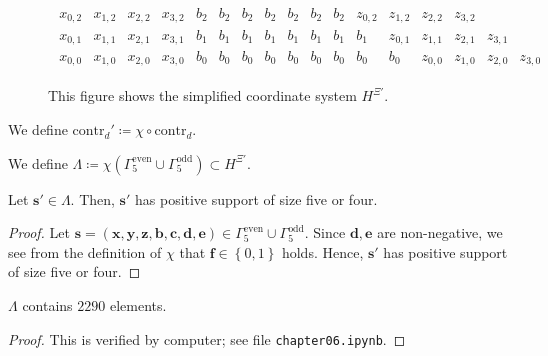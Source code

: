 \begin{definition}
\begin{figure}[H]
\begin{align*}
\begin{array}{cccccccccccccccccccc}
            x_{0,2} & x_{1,2} & x_{2,2} & x_{3,2} & b_2 & b_2 & b_2 & b_2 & b_2 & b_2 & b_2 & z_{0,2} & z_{1,2} & z_{2,2} & z_{3,2} \\
            x_{0,1} & x_{1,1} & x_{2,1} & x_{3,1} & b_1 & b_1 & b_1 & b_1 & b_1 & b_1 & b_1 & b_1 & z_{0,1} & z_{1,1} & z_{2,1} & z_{3,1} \\
            x_{0,0} & x_{1,0} & x_{2,0} & x_{3,0} & b_0 & b_0 & b_0 & b_0 & b_0 & b_0 & b_0 & b_0 & b_0 & z_{0,0} & z_{1,0} & z_{2,0} & z_{3,0}
        \end{array}
    \end{align*}  
    \caption{This figure shows the simplified coordinate system \( H^{\Xi'} \).}
    \label{fig:uhrui23h}
\end{figure}

\end{definition}

\begin{definition}
    We define \( \mathrm{contr}_d' \coloneqq \chi \circ \mathrm{contr}_d \).
\end{definition}


\begin{definition}
    We define \( \Lambda  \coloneqq \chi( \Gamma^{\mathrm{even}}_5 \cup \Gamma^{\mathrm{odd}}_5 ) \subset H^{\Xi'} \).
\end{definition}


\begin{proposition}\label{prop:ieshwu4rhui3w}
    Let \( \mathbf{s}' \in \Lambda \). Then, \( \mathbf{s}' \) has positive support of size five or four.
\end{proposition}

\begin{proof}
    Let \( \mathbf{s} = (\mathbf{x}, \mathbf{y}, \mathbf{z}, \mathbf{b}, \mathbf{c}, \mathbf{d}, \mathbf{e}) \in  \Gamma^{\mathrm{even}}_5 \cup \Gamma^{\mathrm{odd}}_5 \). Since \( \mathbf{d}, \mathbf{e} \) are non-negative, we see from the definition of \( \chi \)
    that \( \mathbf{f} \in \left\{ 0,1 \right\} \) holds. Hence, \( \mathbf{s}' \) has positive support of size five or four.
\end{proof}
\begin{proposition}
    \( \Lambda \) contains \( 2290 \) elements.
\end{proposition}

\begin{proof}
    This is verified by computer; see \cite{ducrepo} file \texttt{chapter06.ipynb}.
\end{proof}

